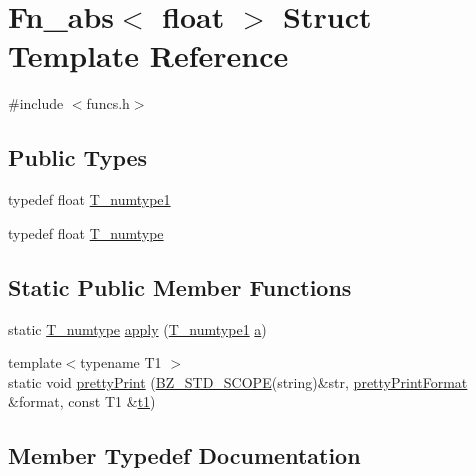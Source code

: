 \hypertarget{structFn__abs_3_01float_01_4}{}\section{Fn\+\_\+abs$<$ float $>$ Struct Template Reference}
\label{structFn__abs_3_01float_01_4}


{\ttfamily \#include $<$funcs.\+h$>$}

\subsection*{Public Types}
\begin{DoxyCompactItemize}
\item 
typedef float \hyperlink{structFn__abs_3_01float_01_4_a386230188058d971cbeed2b3a938a75f}{T\+\_\+numtype1}
\item 
typedef float \hyperlink{structFn__abs_3_01float_01_4_a202a8891a2fa801376309f2e5d13d411}{T\+\_\+numtype}
\end{DoxyCompactItemize}
\subsection*{Static Public Member Functions}
\begin{DoxyCompactItemize}
\item 
static \hyperlink{structFn__abs_3_01float_01_4_a202a8891a2fa801376309f2e5d13d411}{T\+\_\+numtype} \hyperlink{structFn__abs_3_01float_01_4_ade7e16d8c6177b0a43305f9f986fcc81}{apply} (\hyperlink{structFn__abs_3_01float_01_4_a386230188058d971cbeed2b3a938a75f}{T\+\_\+numtype1} \hyperlink{gen__mat5files_8m_aae328bf20413f220e38aec4d95bfd6da}{a})
\item 
{\footnotesize template$<$typename T1 $>$ }\\static void \hyperlink{structFn__abs_3_01float_01_4_a8b88d64b3baaf1d5ba14d4bde66f2d3f}{pretty\+Print} (\hyperlink{numinquire_8h_a2b24ffc3b4ef9803956bc7715c6c7b83}{B\+Z\+\_\+\+S\+T\+D\+\_\+\+S\+C\+O\+P\+E}(string)\&str, \hyperlink{classprettyPrintFormat}{pretty\+Print\+Format} \&format, const T1 \&\hyperlink{sparse_2linalg_2eigen_2arpack_2ARPACK_2SRC_2stat_8h_af377a4e2b03dbeb6590856bdfca3df30}{t1})
\end{DoxyCompactItemize}


\subsection{Member Typedef Documentation}
\hypertarget{structFn__abs_3_01float_01_4_a202a8891a2fa801376309f2e5d13d411}{}
